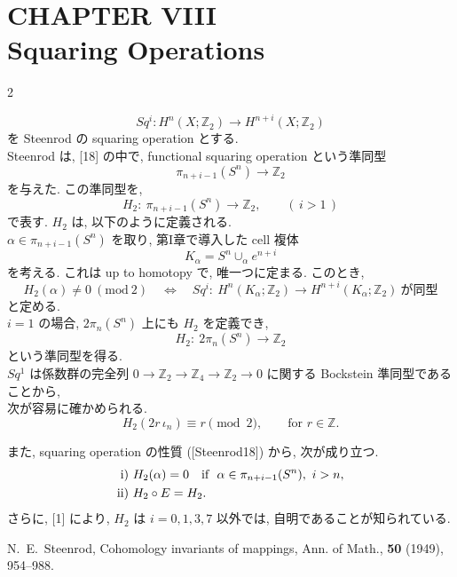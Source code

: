 \documentclass[10pt, leqno]{ltjsarticle}
\author{}
\date{}
\newcommand{\Ex}{E}        %
\newcommand{\pis}[2]{\pi_{#1}(#2)}       %
\newcommand{\z}{\mathbb{Z}}
\newcommand{\sq}[1]{Sq^{#1}}
\numberwithin{equation}{section}
\theoremstyle{plain}
\theoremstyle{definition}
\theoremstyle{remark}
\begin{document}
\setcounter{section}{8}

\section*{CHAPTER VIII\\Squaring Operations}

\begin{paracol}{2}

\[
\sq{i}:H^n(X;\z_2)\longrightarrow H^{n+i}(X;\z_2)
\]
を Steenrod の squaring operation とする.\\
Steenrod は, [18] の中で, functional squaring operation という準同型
\[
\pis{n+i-1}{S^n}\to\z_2
\] 
を与えた. 
この準同型を, 
\[
H_2:\ \pis{n+i-1}{S^n}\longrightarrow \z_2,\qquad (\,i>1\,)
\]
で表す. 
\(H_2\) は, 以下のように定義される. \\
\(\alpha\in \pis{n+i-1}{S^n}\) を取り, 
第I章で導入した cell 複体
\[
K_\alpha=S^n\cup_\alpha e^{n+i}
\]
を考える. 
これは up to homotopy で, 唯一つに定まる.
このとき,
\[
H_2(\alpha)\ne0\ (\mathrm{mod}\ 2)
\quad\Longleftrightarrow\quad
\sq{i}:\ H^n(K_\alpha;\z_2)\longrightarrow H^{n+i}(K_\alpha;\z_2)
\ \text{が同型}
\]
と定める.\\
\(i=1\) の場合, \(2\pis{n}{S^n}\) 上にも \(H_2\) を定義でき, 
\[
H_2:\ 2\pis{n}{S^n}\longrightarrow \z_2
\]
という準同型を得る. \\
\(Sq^1\) は係数群の完全列
\(0\to\z_2\to\z_4\to\z_2\to0\)
に関する Bockstein 準同型であることから, \\
次が容易に確かめられる.
\begin{equation}\label{eq:8.1}
H_2(2r\,\iota_n)\equiv r\pmod2, \qquad \text{for } r\in\z.
\end{equation}

\noindent
また, squaring operation の性質 ([Steenrod18]) から,
次が成り立つ.
\begin{equation}
\raisetag{4ex}
\begin{aligned}[t]
\text{i) }& H_2(\alpha)=0\quad \text{if }\ \alpha\in \pis{n+i-1}{S^n},\ i>n,\\
\text{ii) }& H_2\circ \Ex = H_2 .
\end{aligned}
\end{equation}
さらに, [1] により,
\(H_2\) は \(i=0,1,3,7\) 以外では, 自明であることが知られている.

\switchcolumn

\noindent
\cite{Steenrod1949}
N.~E.~Steenrod,
\newblock Cohomology invariants of mappings,
\newblock Ann. of Math., {\bf 50} (1949), 954--988.


\end{paracol}
\end{document}
